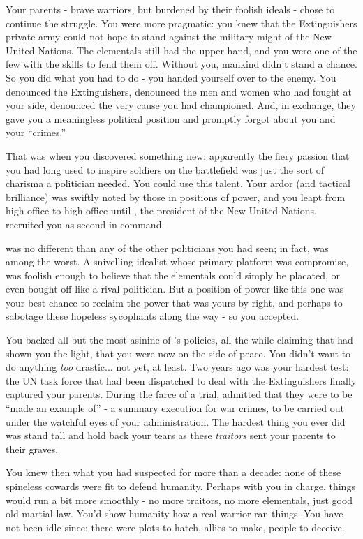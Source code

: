 \documentclass[char]{elementals}
\begin{document}
Your parents - brave warriors, but burdened by their foolish ideals - chose to continue the struggle. You were more pragmatic: you knew that the Extinguishers private army could not hope to stand against the military might of the New United Nations. The elementals still had the upper hand, and you were one of the few with the skills to fend them off. Without you, mankind didn't stand a chance. So you did what you had to do - you handed yourself over to the enemy. You denounced the Extinguishers, denounced the men and women who had fought at your side, denounced the very cause you had championed. And, in exchange, they gave you a meaningless political position and promptly forgot about you and your ``crimes.''

That was when you discovered something new: apparently the fiery passion that you had long used to inspire soldiers on the battlefield was just the sort of charisma a politician needed. You could use this talent. Your ardor (and tactical brilliance) was swiftly noted by those in positions of power, and you leapt from high office to high office until \cLeader{\intro{}} \cLeader{\themself}, the president of the New United Nations, recruited you as \cLeader{\their} second-in-command.

\cLeader{} was no different than any of the other politicians you had seen; in fact, \cLeader{\they} was among the worst. A snivelling idealist whose primary platform was compromise, \cLeader{\they} was foolish enough to believe that the elementals could simply be placated, or even bought off like a rival politician. But a position of power like this one was your best chance to reclaim the power that was yours by right, and perhaps to sabotage these hopeless sycophants along the way - so you accepted. 

You backed all but the most asinine of \cLeader{}'s policies, all the while claiming that \cLeader{\they} had shown you the light, that you were now on the side of peace. You didn't want to do anything \emph{too} drastic... not yet, at least. Two years ago was your hardest test: the UN task force that had been dispatched to deal with the Extinguishers finally captured your parents. During the farce of a trial, \cLeader{} admitted that they were to be ``made an example of'' - a summary execution for war crimes, to be carried out under the watchful eyes of your administration. The hardest thing you ever did was stand tall and hold back your tears as these \emph{traitors} sent your parents to their graves.

You knew then what you had suspected for more than a decade: none of these spineless cowards were fit to defend humanity. Perhaps with you in charge, things would run a bit more smoothly - no more traitors, no more elementals, just good old martial law. You'd show humanity how a real warrior ran things. You have not been idle since: there were plots to hatch, allies to make, people to deceive. 
\end{document}
